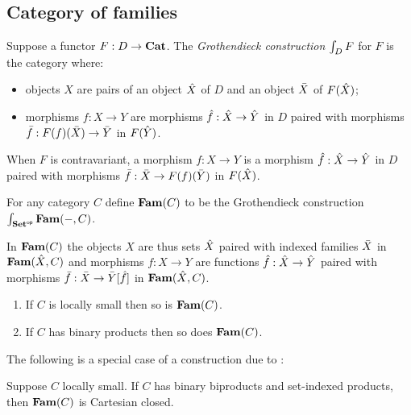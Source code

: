 \subsection{Category of families}

\begin{definition}
Suppose a functor $F: D \to \mathbf{Cat}$. The \emph{Grothendieck construction} $\int_{D}F$ for $F$ is the
category where:
\begin{itemize}
\item objects $X$ are pairs of an object $\hat{X}$ of $D$ and an object $\bar{X}$ of $F(\hat{X})$;
\item morphisms $f: X \to Y$ are morphisms $\hat{f}: \hat{X} \to \hat{Y}$ in $D$ paired with morphisms
$\bar{f}: F(f)(\bar{X}) \to \bar{Y}$ in $F(\hat{Y})$.
\end{itemize}
\end{definition}

\noindent When $F$ is contravariant, a morphism $f: X \to Y$ is a morphism $\hat{f}: \hat{X} \to \hat{Y}$ in
$D$ paired with morphisms $\bar{f}: \bar{X} \to F(f)(\bar{Y})$ in $F(\hat{X})$.

\begin{definition}
For any category $C$ define $\mathbf{Fam}(C)$ to be the Grothendieck construction
$\int_{\mathbf{Set}^{\mathsf{op}}}\mathbf{Fam}(-,C)$.
\end{definition}

\noindent In $\mathbf{Fam}(C)$ the objects $X$ are thus sets $\hat{X}$ paired with indexed families $\bar{X}$ in
$\mathbf{Fam}(\hat{X},C)$ and morphisms $f: X \to Y$ are functions $\hat{f}: \hat{X} \to \hat{Y}$ paired with
morphisms $\bar{f}: \bar{X} \to \bar{Y}[\hat{f}]$ in $\mathbf{Fam}(\hat{X},C)$.

\begin{proposition}
\item
\begin{enumerate}
\item If $C$ is locally small then so is $\mathbf{Fam}(C)$.
\item If $C$ has binary products then so does $\mathbf{Fam}(C)$.
\end{enumerate}
\end{proposition}

The following is a special case of a construction due to \citet{nunes2023}:

\begin{proposition}
Suppose $C$ locally small. If $C$ has binary biproducts and set-indexed products, then $\mathbf{Fam}(C)$ is Cartesian
closed. 
\end{proposition}

